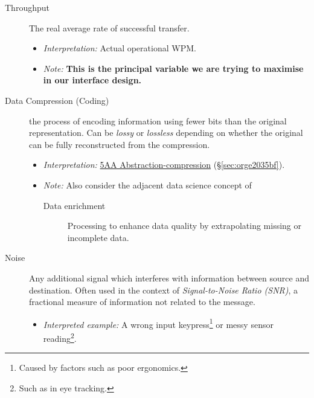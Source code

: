 \documentclass[logo,bsc,singlespacing,parskip]{infthesis}
\begin{document}
{\begin{mdframed}
\begin{description}
\item[{Throughput}] The real average rate of successful transfer.
\begin{itemize}
\item \emph{Interpretation:} Actual operational WPM.
\item \emph{Note:} \textbf{This is the principal variable we are trying to maximise in our interface design.}
\end{itemize}
\end{description}
\end{mdframed}

\begin{mdframed}
\begin{description}
\item[{Data Compression (Coding)}] the process of encoding information using fewer bits than the original representation. Can be \emph{lossy} or \emph{lossless} depending on whether the original can be fully reconstructed from the compression.
\begin{itemize}
\item \emph{Interpretation:} \hyperref[sec:orge2035bf]{5AA Abstraction-compression} (\S \ref{sec:orge2035bf}).
\item \emph{Note:} Also consider the adjacent data science concept of
\begin{description}
\item[{Data enrichment}] Processing to enhance data quality by extrapolating missing or incomplete data.
\end{description}
\end{itemize}
\end{description}
\end{mdframed}

\begin{mdframed}
\begin{description}
\item[{Noise\label{noise}}] Any additional signal which interferes with information between source and destination.
Often used in the context of \emph{Signal-to-Noise Ratio (SNR)}, a fractional measure of information not related to the message.
\begin{itemize}
\item \emph{Interpreted example:} A wrong input keypress\footnote{Caused by factors such as poor ergonomics.} or messy sensor reading\footnote{Such as in eye tracking.}.
\end{itemize}
\end{description}
\end{mdframed}

}
\end{document}
